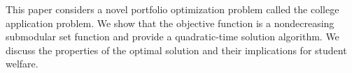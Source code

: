 This paper considers a novel portfolio optimization problem called the college application problem. We show that the objective function is a nondecreasing submodular set function and provide a quadratic-time solution algorithm. We discuss the properties of the optimal solution and their implications for student welfare.

